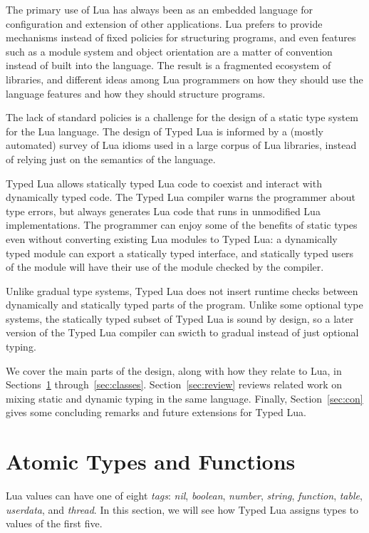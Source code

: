 \documentclass[preprint]{sig-alternate}
\begin{document}
The primary use of Lua has always been as an embedded language
for configuration and extension of other applications.
Lua prefers to provide mechanisms instead of fixed policies
for structuring programs, and even features
such as a module system and object orientation are a matter of 
convention instead of built into the language.
The result is a fragmented ecosystem of libraries, and
different ideas among Lua programmers on how they should use
the language features and how they should structure programs.

The lack of standard policies
is a challenge for the design of a static type system for the Lua
language. The design of Typed Lua is informed by a (mostly
automated) survey of Lua idioms used in a large corpus of Lua
libraries, instead of relying just on the semantics of the
language.

Typed Lua allows statically typed Lua code to coexist and
interact with dynamically typed code. The Typed Lua compiler
warns the programmer about type errors, but always generates
Lua code that runs in unmodified Lua implementations. The
programmer can enjoy some of the benefits of static types even
without converting existing Lua modules to Typed Lua:
a dynamically typed module can export a statically typed
interface, and statically typed users of the module will have
their use of the module checked by the compiler.

Unlike gradual type systems, Typed Lua does not insert runtime
checks between dynamically and statically typed parts of the
program. Unlike some optional type systems, the statically
typed subset of Typed Lua is sound by design, so a later
version of the Typed Lua compiler can swicth to gradual
instead of just optional typing.

We cover the main parts of the design, along with
how they relate to Lua, in Sections~\ref{sec:atomic}
through~\ref{sec:classes}. Section~\ref{sec:review} reviews
related work on mixing static and dynamic typing in the same
language. Finally, Section~\ref{sec:con} gives some
concluding remarks and future extensions for Typed Lua.

\section{Atomic Types and Functions}
\label{sec:atomic}

Lua values can have one of eight {\em tags}: {\em nil}, {\em boolean},
{\em number}, {\em string}, {\em function}, {\em table}, {\em userdata},
and {\em thread}. In this section, we will see how Typed Lua assigns types to
values of the first five.
\end{document}
